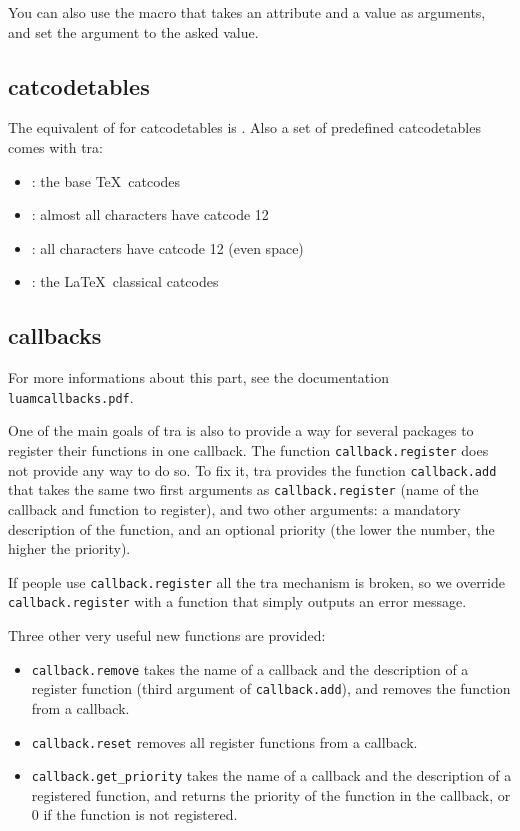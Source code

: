 \documentclass{article}
\begin{document}
You can also use the macro \texttt{\string\setluaattribute} that takes an
attribute and a value as arguments, and set the argument to the asked value.

\subsection{catcodetables}

The equivalent of \texttt{\string\newcount} for catcodetables is
\texttt{\string\newluacatcodetable}. Also a set of predefined catcodetables
comes with \LuaTeX tra:

\begin{itemize}
  \item \texttt{\string\CatcodeTableIniTeX}: the base \TeX\ catcodes
  \item \texttt{\string\CatcodeTableString}: almost all characters have
    catcode 12
  \item \texttt{\string\CatcodeTableOther}: all characters have catcode 12
    (even space)
  \item \texttt{\string\CatcodeTableLaTeX}: the \LaTeX\ classical catcodes
\end{itemize}

\subsection{callbacks}

For more informations about this part, see the documentation
\texttt{luamcallbacks.pdf}.

One of the main goals of \LuaTeX tra is also to provide a way for several
packages to register their functions in one callback. The function
\texttt{callback.register} does not provide any way to do so. To fix it,
\LuaTeX tra provides the function \texttt{callback.add} that takes the same
two first arguments as \texttt{callback.register} (name of the callback and
function to register), and two other arguments: a mandatory description of the
function, and an optional priority (the lower the number, the higher the
priority).

If people use \texttt{callback.register} all the \LuaTeX tra mechanism is
broken, so we override \texttt{callback.register} with a function that simply
outputs an error message.

Three other very useful new functions are provided:

\begin{itemize}
  \item \texttt{callback.remove} takes the name of a callback and the
    description of a register function (third argument of
    \texttt{callback.add}), and removes the function from a callback.
  \item \texttt{callback.reset} removes all register functions from a
    callback.
  \item \texttt{callback.get\_priority} takes the name of a callback and the
    description of a registered function, and returns the priority of the
    function in the callback, or 0 if the function is not registered.
\end{itemize}
\end{document}
